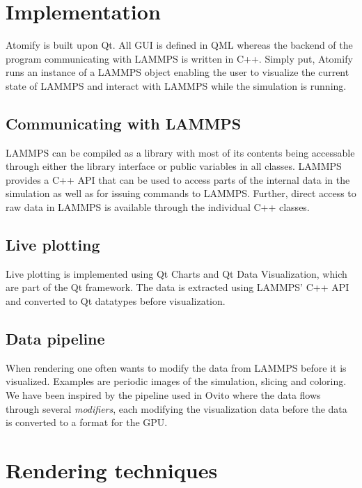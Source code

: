 \documentclass[aps,pre,twocolumn,letterpaper,floatfix]{revtex4}
\begin{document}
{\section{Implementation}

Atomify is built upon Qt.
All GUI is defined in QML whereas the backend of the program communicating with
LAMMPS is written in C++.
Simply put, Atomify runs an instance of a LAMMPS object enabling the user to
visualize the current state of LAMMPS and interact with LAMMPS while the
simulation is running. 

\subsection{Communicating with LAMMPS}

LAMMPS can be compiled as a library with most of its contents being accessable
through either the library interface or public variables in all classes.
LAMMPS provides a C++ API that can be used to access parts of the internal data
in the simulation as well as for issuing commands to LAMMPS.
Further, direct access to raw data in LAMMPS is available through the individual
C++ classes.

\subsection{Live plotting}

Live plotting is implemented using Qt Charts and Qt Data Visualization,
which are part of the Qt framework.
The data is extracted using LAMMPS' C++ API and converted to Qt datatypes before
visualization.

\subsection{Data pipeline}

When rendering one often wants to modify the data
from LAMMPS before it is visualized.
Examples are periodic images of the simulation,
slicing and coloring.
We have been inspired by the pipeline used in Ovito where the data flows through
several \textit{modifiers}, each modifying the visualization data before the
data is converted to a format for the GPU.

\section{Rendering techniques}

}
\end{document}
